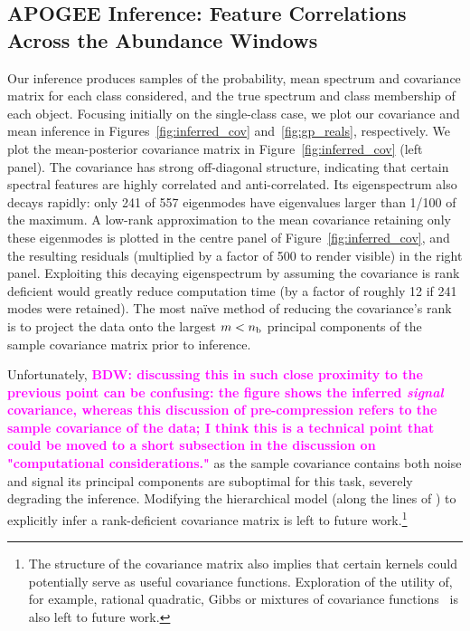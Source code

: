 \documentclass[a4paper,fleqn,usenatbib]{mnras}
\newcommand{\nb}{n_{\rm b}}
\newcommand{\bdw}[1]{\textbf{\textcolor{magenta}{BDW: #1}}}
\begin{document}
\subsection{APOGEE Inference: Feature Correlations Across the Abundance Windows}
\label{sec:inference}


Our inference produces samples of the probability, mean spectrum and covariance matrix for each class considered, and the true spectrum and class membership of each object. Focusing initially on the single-class case, we plot our covariance and mean inference in Figures~\ref{fig:inferred_cov} and~\ref{fig:gp_reals}, respectively. We plot the mean-posterior covariance matrix in Figure~\ref{fig:inferred_cov} (left panel). The covariance has strong off-diagonal structure, indicating that certain spectral features are highly correlated and anti-correlated. Its eigenspectrum also decays rapidly: only 241 of 557 eigenmodes have eigenvalues larger than 1/100 of the maximum. A low-rank approximation to the mean covariance retaining only these eigenmodes is plotted in the centre panel of Figure~\ref{fig:inferred_cov}, and the resulting residuals (multiplied by a factor of 500 to render visible) in the right panel. Exploiting this decaying eigenspectrum by assuming the covariance is rank deficient would greatly reduce computation time (by a factor of roughly 12 if 241 modes were retained). The most na\"ive method of reducing the covariance's rank is to project the data onto the largest $m < \nb$ principal components of the sample covariance matrix prior to inference. 

Unfortunately, \bdw{discussing this in such close proximity to the previous point can be confusing: the figure shows the inferred \textit{signal} covariance, whereas this discussion of pre-compression refers to the sample covariance of the data; I think this is a technical point that could be moved to a short subsection in the discussion on "computational considerations."} as the sample covariance contains both noise and signal its principal components are suboptimal for this task, severely degrading the inference. Modifying the hierarchical model (along the lines of \citet{Zhang_etal:2013}) to explicitly infer a rank-deficient covariance matrix is left to future work.\footnote{The structure of the covariance matrix also implies that certain kernels could potentially serve as useful covariance functions. Exploration of the utility of, for example, rational quadratic, Gibbs or mixtures of covariance functions~\citep{Rasmussen_Williams} is also left to future work.}
\end{document}
